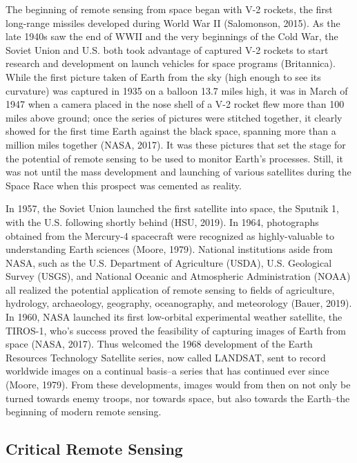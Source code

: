 \documentclass{book}\usepackage{knitr}
\begin{document}
The beginning of remote sensing from space began with V-2 rockets, the first long-range missiles developed during World War II (Salomonson, 2015). As the late 1940s saw the end of WWII and the very beginnings of the Cold War, the Soviet Union and U.S. both took advantage of captured V-2 rockets to start research and development on launch vehicles for space programs (Britannica). While the first picture taken of Earth from the sky (high enough to see its curvature) was captured in 1935 on a balloon 13.7 miles high, it was in March of 1947 when a camera placed in the nose shell of a V-2 rocket flew more than 100 miles above ground; once the series of pictures were stitched together, it clearly showed for the first time Earth against the black space, spanning more than a million miles together (NASA, 2017). It was these pictures that set the stage for the potential of remote sensing to be used to monitor Earth’s processes. Still, it was not until the mass development and launching of various satellites during the Space Race when this prospect was cemented as reality.

In 1957, the Soviet Union launched the first satellite into space, the Sputnik 1, with the U.S. following shortly behind (HSU, 2019). In 1964, photographs obtained from the Mercury-4 spacecraft were recognized as highly-valuable to understanding Earth sciences (Moore, 1979). National institutions aside from NASA, such as the U.S. Department of Agriculture (USDA), U.S. Geological Survey (USGS), and National Oceanic and Atmospheric Administration (NOAA) all realized the potential application of remote sensing to fields of agriculture, hydrology, archaeology, geography, oceanography, and meteorology (Bauer, 2019). In 1960, NASA launched its first low-orbital experimental weather satellite, the TIROS-1, who’s success proved the feasibility of capturing images of Earth from space (NASA, 2017). Thus welcomed the 1968 development of the Earth Resources Technology Satellite series, now called LANDSAT, sent to record worldwide images on a continual basis--a series that has continued ever since (Moore, 1979). From these developments, images would from then on not only be turned towards enemy troops, nor towards space, but also towards the Earth--the beginning of modern remote sensing.

\subsection{Critical Remote Sensing}
\end{document}
